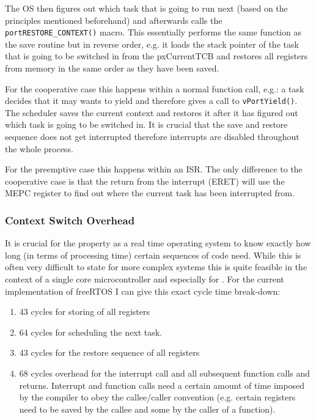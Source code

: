 The OS then figures out which task that is going to run next (based on the principles mentioned beforehand) and afterwards calls the \verb+portRESTORE_CONTEXT()+ macro. This essentially performs the same function as the save routine but in reverse order, e.g. it loads the stack pointer of the task that is going to be switched in from the pxCurrentTCB and restores all registers from memory in the same order as they have been saved.


For the cooperative case this happens within a normal function call, e.g.: a task decides that it may wants to yield and therefore gives a call to \verb+vPortYield()+. The scheduler saves the current context and restores it after it has figured out which task is going to be switched in. It is crucial that the save and restore sequence does not get interrupted therefore interrupts are disabled throughout the whole process.

For the preemptive case this happens within an ISR. The only difference to the cooperative case is that the return from the interrupt (ERET) will use the MEPC register to find out where the current task has been interrupted from.

\subsubsection{Context Switch Overhead}

It is crucial for the property as a real time operating system to know exactly how long (in terms of processing time) certain sequences of code need. While this is often very difficult to state for more complex systems this is quite feasible in the context of a single core microcontroller and especially for \pulpino. For the current implementation of freeRTOS I can give this exact cycle time break-down:

\begin{enumerate}
  \item 43 cycles for storing of all registers
  \item 64 cycles for scheduling the next task.
  \item 43 cycles for the restore sequence of all registers
  \item 68 cycles overhead for the interrupt call and all subsequent function calls and returns. Interrupt and function calls need a certain amount of time imposed by the compiler to obey the callee/caller convention (e.g. certain registers need to be saved by the callee and some by the caller of a function).
\end{enumerate}

